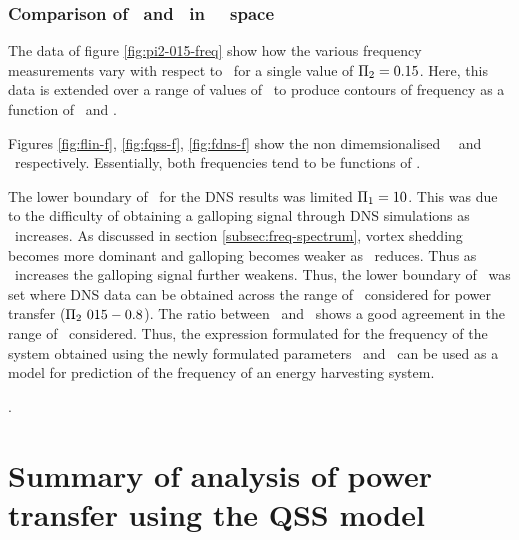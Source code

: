 \subsubsection{Comparison of \freqlin\ and \freqqss\ in \massstiff\ \massdamp\ space}

The data of figure \ref{fig:pi2-015-freq} show how the various frequency measurements vary with respect to \massstiff\ for a single value of $\Pi_2 = 0.15$. Here, this data is extended over a range of values of \massdamp\ to produce contours of frequency as a function of \massstiff\ and \massdamp.








Figures \ref{fig:flin-f}, \ref{fig:fqss-f},  \ref{fig:fdns-f} show the non dimemsionalised \freqlin\, \freqqss\ and \freqdns\ respectively. Essentially, both frequencies tend to be functions of \massstiff.   

  


The lower boundary of \massstiff\ for the DNS results was limited $\Pi_1=10$. This was due to the difficulty of obtaining a galloping signal through DNS simulations as \massdamp\ increases. As discussed in section \ref{subsec:freq-spectrum}, vortex shedding becomes more dominant and galloping becomes weaker as \massstiff\ reduces. Thus as \massdamp\ increases the galloping signal further weakens. Thus, the lower boundary of \massstiff\  was set where DNS data can be obtained across the range of \massdamp\ considered for power transfer ($\massdamp\ 015-0.8$). The ratio between \freqlin\ and \freqdns\ shows a good agreement in the range of \massstiff\ considered. Thus, the expression formulated for the frequency of the system obtained using the newly formulated parameters \massstiff\ and \massdamp\ can be used as a model for prediction of the frequency of an energy harvesting system.  
	

. %


\section{Summary of analysis of power transfer using the QSS model}
\label{sec:summary-pi_1-pi_2}

